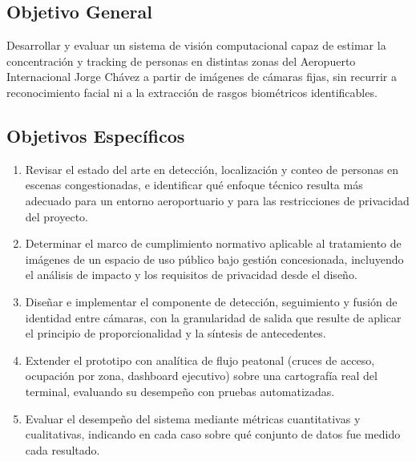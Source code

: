 \subsection{Objetivo General}
\label{subsec:objetivo-general}

Desarrollar y evaluar un sistema de visión computacional capaz de estimar la
concentración y tracking de personas en distintas zonas del Aeropuerto Internacional Jorge
Chávez a partir de imágenes de cámaras fijas, sin recurrir a reconocimiento facial ni a la
extracción de rasgos biométricos identificables.

\subsection{Objetivos Específicos}
\label{subsec:objetivos-especificos}

\begin{enumerate}
  \item Revisar el estado del arte en detección, localización y conteo de personas en escenas
  congestionadas, e identificar qué enfoque técnico resulta más adecuado para un entorno
  aeroportuario y para las restricciones de privacidad del proyecto.
  \item Determinar el marco de cumplimiento normativo aplicable al tratamiento de imágenes
  de un espacio de uso público bajo gestión concesionada, incluyendo el análisis de
  impacto y los requisitos de privacidad desde el diseño.
  \item Diseñar e implementar el componente de detección, seguimiento y fusión de identidad
  entre cámaras, con la granularidad de salida que resulte de aplicar el principio de
  proporcionalidad y la síntesis de antecedentes.
  \item Extender el prototipo con analítica de flujo peatonal (cruces de acceso, ocupación por
  zona, dashboard ejecutivo) sobre una cartografía real del terminal, evaluando su
  desempeño con pruebas automatizadas.
  \item Evaluar el desempeño del sistema mediante métricas cuantitativas y cualitativas,
  indicando en cada caso sobre qué conjunto de datos fue medido cada resultado.
\end{enumerate}
